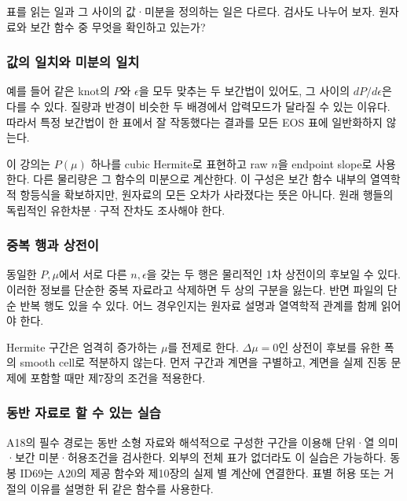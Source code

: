 \documentclass[
  10pt,
  a4paper,
]{article}
\begin{document}
표를 읽는 일과 그 사이의 값·미분을 정의하는 일은 다르다. 검사도 나누어
보자. 원자료와 보간 함수 중 무엇을 확인하고 있는가?

\subsubsection{값의 일치와 미분의
일치}\label{uxac12uxc758-uxc77cuxce58uxc640-uxbbf8uxbd84uxc758-uxc77cuxce58}

예를 들어 같은 knot의 \(P\)와 \(\epsilon\)을 모두 맞추는 두 보간법이
있어도, 그 사이의 \(dP/d\epsilon\)은 다를 수 있다. 질량과 반경이 비슷한
두 배경에서 압력모드가 달라질 수 있는 이유다. 따라서 특정 보간법이 한
표에서 잘 작동했다는 결과를 모든 EOS 표에 일반화하지 않는다.

이 강의는 \(P(\mu)\) 하나를 cubic Hermite로 표현하고 raw \(n\)을
endpoint slope로 사용한다. 다른 물리량은 그 함수의 미분으로 계산한다. 이
구성은 보간 함수 내부의 열역학적 항등식을 확보하지만, 원자료의 모든
오차가 사라졌다는 뜻은 아니다. 원래 행들의 독립적인 유한차분·구적 잔차도
조사해야 한다.

\subsubsection{중복 행과
상전이}\label{uxc911uxbcf5-uxd589uxacfc-uxc0c1uxc804uxc774}

동일한 \(P,\mu\)에서 서로 다른 \(n,\epsilon\)을 갖는 두 행은 물리적인
1차 상전이의 후보일 수 있다. 이러한 정보를 단순한 중복 자료라고 삭제하면
두 상의 구분을 잃는다. 반면 파일의 단순 반복 행도 있을 수 있다. 어느
경우인지는 원자료 설명과 열역학적 관계를 함께 읽어야 한다.

Hermite 구간은 엄격히 증가하는 \(\mu\)를 전제로 한다. \(\Delta\mu=0\)인
상전이 후보를 유한 폭의 smooth cell로 적분하지 않는다. 먼저 구간과
계면을 구별하고, 계면을 실제 진동 문제에 포함할 때만 제7장의 조건을
적용한다.

\subsubsection{동반 자료로 할 수 있는
실습}\label{uxb3d9uxbc18-uxc790uxb8ccuxb85c-uxd560-uxc218-uxc788uxb294-uxc2e4uxc2b5}

A18의 필수 경로는 동반 소형 자료와 해석적으로 구성한 구간을 이용해
단위·열 의미·보간 미분·허용조건을 검사한다. 외부의 전체 표가 없더라도 이
실습은 가능하다. 동봉 ID69는 A20의 제공 함수와 제10장의 실제 별 계산에
연결한다. 표별 허용 또는 거절의 이유를 설명한 뒤 같은 함수를 사용한다.
\end{document}
